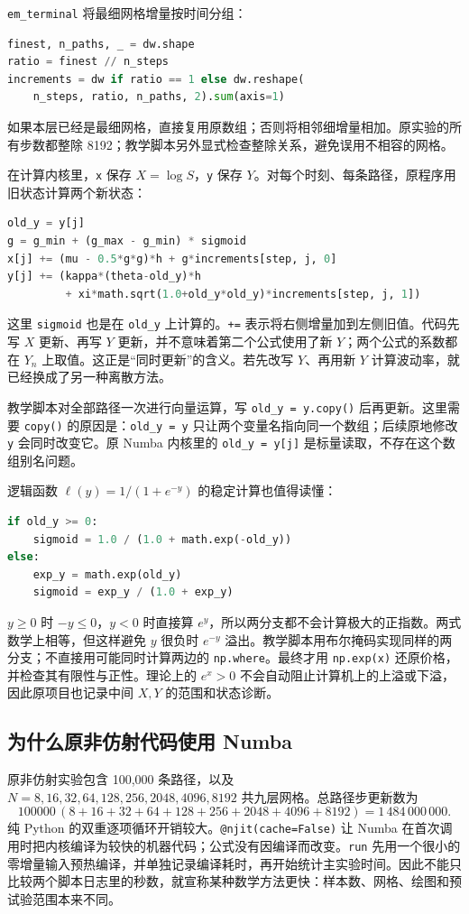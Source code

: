 \documentclass[11pt,a4paper,fontset=none]{ctexart}
\numberwithin{equation}{section}
\begin{document}
\texttt{em\_terminal} 将最细网格增量按时间分组：
\begin{lstlisting}[language=Python]
finest, n_paths, _ = dw.shape
ratio = finest // n_steps
increments = dw if ratio == 1 else dw.reshape(
    n_steps, ratio, n_paths, 2).sum(axis=1)
\end{lstlisting}
如果本层已经是最细网格，直接复用原数组；否则将相邻细增量相加。原实验的所有步数都整除 8192；教学脚本另外显式检查整除关系，避免误用不相容的网格。

在计算内核里，\texttt{x} 保存 $X=\log S$，\texttt{y} 保存 $Y$。对每个时刻、每条路径，原程序用旧状态计算两个新状态：
\begin{lstlisting}[language=Python]
old_y = y[j]
g = g_min + (g_max - g_min) * sigmoid
x[j] += (mu - 0.5*g*g)*h + g*increments[step, j, 0]
y[j] += (kappa*(theta-old_y)*h
         + xi*math.sqrt(1.0+old_y*old_y)*increments[step, j, 1])
\end{lstlisting}
这里 \texttt{sigmoid} 也是在 \texttt{old\_y} 上计算的。\texttt{+=} 表示将右侧增量加到左侧旧值。代码先写 $X$ 更新、再写 $Y$ 更新，并不意味着第二个公式使用了新 $Y$；两个公式的系数都在 $Y_n$ 上取值。这正是“同时更新”的含义。若先改写 $Y$、再用新 $Y$ 计算波动率，就已经换成了另一种离散方法。

教学脚本对全部路径一次进行向量运算，写 \texttt{old\_y = y.copy()} 后再更新。这里需要 \texttt{copy()} 的原因是：\texttt{old\_y = y} 只让两个变量名指向同一个数组；后续原地修改 \texttt{y} 会同时改变它。原 Numba 内核里的 \texttt{old\_y = y[j]} 是标量读取，不存在这个数组别名问题。

逻辑函数 $\ell(y)=1/(1+e^{-y})$ 的稳定计算也值得读懂：
\begin{lstlisting}[language=Python]
if old_y >= 0:
    sigmoid = 1.0 / (1.0 + math.exp(-old_y))
else:
    exp_y = math.exp(old_y)
    sigmoid = exp_y / (1.0 + exp_y)
\end{lstlisting}
$y\geq0$ 时 $-y\leq0$，$y<0$ 时直接算 $e^y$，所以两分支都不会计算极大的正指数。两式数学上相等，但这样避免 $y$ 很负时 $e^{-y}$ 溢出。教学脚本用布尔掩码实现同样的两分支；不直接用可能同时计算两边的 \texttt{np.where}。最终才用 \texttt{np.exp(x)} 还原价格，并检查其有限性与正性。理论上的 $e^x>0$ 不会自动阻止计算机上的上溢或下溢，因此原项目也记录中间 $X,Y$ 的范围和状态诊断。

\subsection{为什么原非仿射代码使用 Numba}

原非仿射实验包含 100,000 条路径，以及 $N=8,16,32,64,128,256,2048,4096,8192$ 共九层网格。总路径步更新数为
\[
100000\,(8+16+32+64+128+256+2048+4096+8192)
=1\,484\,000\,000.
\]
纯 Python 的双重逐项循环开销较大。\texttt{@njit(cache=False)} 让 Numba 在首次调用时把内核编译为较快的机器代码；公式没有因编译而改变。\texttt{run} 先用一个很小的零增量输入预热编译，并单独记录编译耗时，再开始统计主实验时间。因此不能只比较两个脚本日志里的秒数，就宣称某种数学方法更快：样本数、网格、绘图和预试验范围本来不同。
\end{document}
